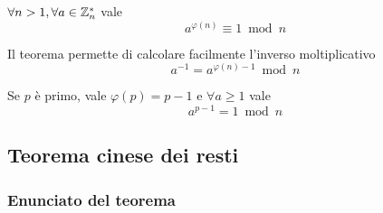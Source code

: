 \begin{theorem}
    \label{teo:eulero}
    $
    \forall n > 1,
    \forall a \in \mathbb{Z}_{n}^{*} 
    $
    vale
    \begin{equation*}
        a^{\varphi (n)}
        \equiv 1 \bmod n
    \end{equation*}
\end{theorem}
Il teorema permette di calcolare facilmente l'inverso moltiplicativo
\begin{equation*}
    a^{-1}
    =
    a^{\varphi (n) - 1} \bmod n
\end{equation*}

\begin{corollario}
    \label{cor:piccolo_fermat}
    Se $p$ è primo, vale $
    \varphi (p) = p-1
    $ e $
    \forall a \geq 1
    $ vale
    \begin{equation*}
        a^{p-1} = 1 \bmod n 
    \end{equation*}
\end{corollario}

\subsection{Teorema cinese dei resti}

\subsubsection{Enunciato del teorema}

